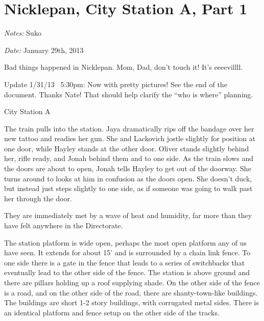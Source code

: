 \setcounter{chapter}{ 14 }
\chapter{\textbf{Nicklepan, City Station A, Part 1} }






\textit{Notes:} Suko

\textit{Date:} January 29th, 2013



Bad things happened in Nicklepan.  Mom, Dad, don't touch it!  It's eeeevillll.



Update 1/31/13 ~5:30pm:  Now with pretty pictures!  See the end of the document.  Thanks Nate!  That should help clarify the ``who is where'' planning.



\noindent\hrulefill





 {\LARGE City Station A } 



The train pulls into the station.  Jaya dramatically rips off the bandage over her new tattoo and readies her gun.  She and Lackovich jostle slightly for position at one door, while Hayley stands at the other door.  Oliver stands slightly behind her, rifle ready, and Jonah behind them and to one side.  As the train slows and the doors are about to open, Jonah tells Hayley to get out of the doorway.  She turns around to looks at him in confusion as the doors open.  She doesn't duck, but instead just steps slightly to one side, as if someone was going to walk past her through the door.



They are immediately met by a wave of heat and humidity, far more than they have felt anywhere in the Directorate.



The station platform is wide open, perhaps the most open platform any of us have seen.  It extends for about 15' and is surrounded by a chain link fence.   To one side there is a gate in the fence that leads to a series of switchbacks that eventually lead to the other side of the fence.  The station is above ground and there are pillars holding up a roof supplying shade.  On the other side of the fence is a road, and on the other side of the road, there are shanty-town-like buildings. The buildings are short 1-2 story buildings, with corrugated metal sides.  There is an identical platform and fence setup on the other side of the tracks.



